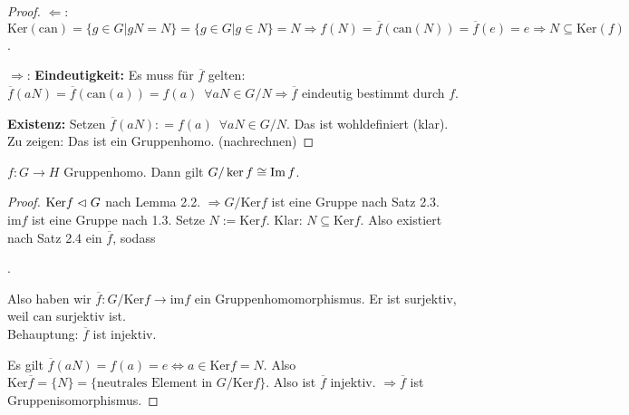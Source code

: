 \documentclass[12pt,a4paper]{scrartcl}
\begin{document}
\begin{proof}
	\glqq $\Leftarrow$\grqq: $\mbox{Ker}(\mbox{can}) = \{g\in G|gN = N\} = \{g\in G|g\in N\} = N \Rightarrow f(N) = \overline{f}(\mbox{can}(N)) = \overline{f}(e) = e\Rightarrow N\subseteq \mbox{Ker}(f)$.
	
	\noindent \glqq $\Rightarrow$\grqq: \textbf{Eindeutigkeit:} Es muss für $\overline{f}$ gelten: $\overline{f}(aN)=\overline{f}(\mbox{can}(a)) = f(a)\enspace \forall aN\in G/N\Rightarrow \overline{f}$ eindeutig bestimmt durch $f$.
	
	\textbf{Existenz:} Setzen $\overline{f}(aN): = f(a)\enspace \forall aN\in G/N$. Das ist wohldefiniert (klar). Zu zeigen: Das ist ein Gruppenhomo. (nachrechnen)
\end{proof}

\begin{kor}
	$f\colon G\to H$ Gruppenhomo. Dann gilt $G/\operatorname{ker} f \cong \operatorname{Im} f$.
\end{kor}
\begin{proof}
	$\mbox{Ker}f\vartriangleleft G$ nach Lemma 2.2. $\Rightarrow G/\mbox{Ker}f$ ist eine Gruppe nach Satz 2.3. $\mbox{im}f$ ist eine Gruppe nach 1.3. Setze $N:= \mbox{Ker}f$. Klar: $N\subseteq \mbox{Ker}f$. Also existiert nach Satz 2.4 ein $\overline{f}$, sodass
	
	.
	
	Also haben wir $\overline{f}\colon G/\mbox{Ker}f\to \mbox{im}f$ ein Gruppenhomomorphismus. Er ist surjektiv, weil $\mbox{can}$ surjektiv ist. \\
	Behauptung: $\overline{f}$ ist injektiv.
	
	Es gilt $\overline{f}(aN)=f(a) = e \Leftrightarrow a\in \mbox{Ker}f = N$. Also $\mbox{Ker}\overline{f} = \{N\} = \{\mbox{neutrales Element in }G/\mbox{Ker}f\}$. Also ist $\overline{f}$ injektiv. $\Rightarrow \overline{f}$ ist Gruppenisomorphismus.
\end{proof}
\end{document}
